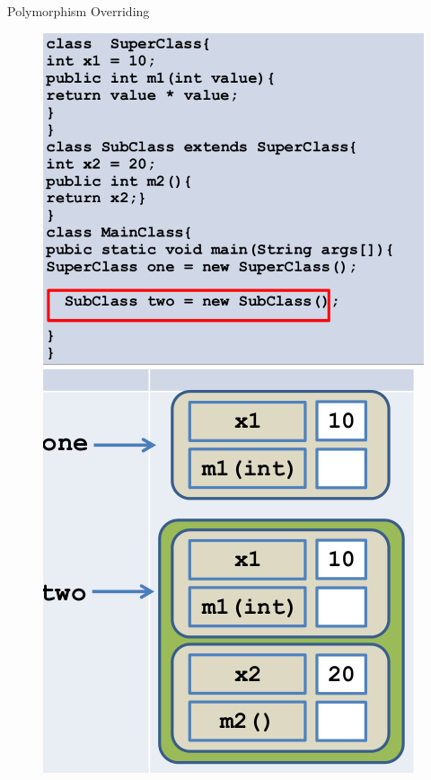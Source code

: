 \documentclass[14pt]{beamer}
\begin{document}
\begin{frame}[fragile]{Polymorphism}
 Overriding
 
 \begin{figure}[H]
\begin{minipage}[l]{0.5\linewidth}
\includegraphics[scale=.2]{polyoverride3.png}

\end{minipage}
\quad
\begin{minipage}[c]{0.3\textwidth}
\includegraphics[scale=.2]{polyoverride4.png}

\end{minipage}
\end{figure}
\end{frame}
\end{document}
